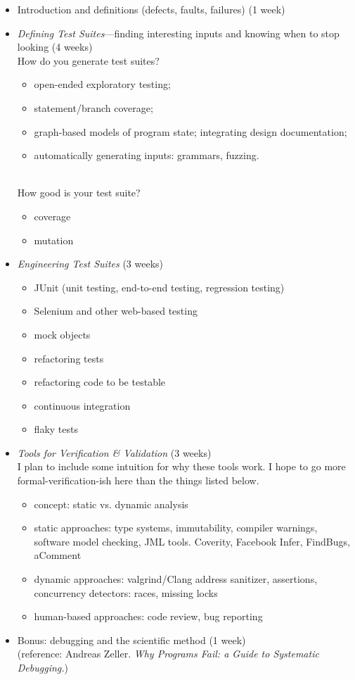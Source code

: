 \documentclass{article}
\begin{document}
\begin{itemize}
\item Introduction and definitions (defects, faults, failures) (1 week)
\item \emph{Defining Test Suites}---finding interesting inputs and knowing when to stop looking (4 weeks)\\
How do you generate test suites?
\begin{itemize}
\item open-ended exploratory testing;
\item statement/branch coverage;
\item graph-based models of program state; integrating design documentation;
\item automatically generating inputs: grammars, fuzzing.
\end{itemize}~\\[-1em]
How good is your test suite?
\begin{itemize}
\item coverage
\item mutation
\end{itemize}

\item \emph{Engineering Test Suites} (3 weeks)
\begin{itemize}
\item JUnit (unit testing, end-to-end testing, regression testing)
\item Selenium and other web-based testing
\item mock objects
\item refactoring tests
\item refactoring code to be testable
\item continuous integration
\item flaky tests
\end{itemize}

\item \emph{Tools for Verification \& Validation} (3 weeks)\\
I plan to include some intuition for why these tools work. I hope to go more formal-verification-ish here than the things listed below.

\begin{itemize}
\item concept: static vs. dynamic analysis
\item static approaches: type systems, immutability, compiler warnings, software model checking, JML tools. Coverity, Facebook Infer, FindBugs, aComment
\item dynamic approaches: valgrind/Clang address sanitizer, assertions, concurrency detectors: races, missing locks
\item human-based approaches: code review, bug reporting
\end{itemize}

\item Bonus: debugging and the scientific method (1 week) \\
(reference: Andreas Zeller. \emph{Why Programs Fail: a Guide to Systematic Debugging.})
\end{itemize}
\end{document}
